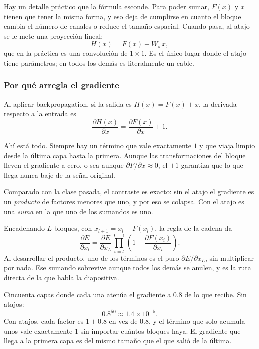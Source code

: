 \documentclass[11pt,letterpaper]{article}
\begin{document}
Hay un detalle práctico que la fórmula esconde. Para poder sumar,
$F(x)$ y $x$ tienen que tener la misma forma, y eso deja de cumplirse
en cuanto el bloque cambia el número de canales o reduce el tamaño
espacial. Cuando pasa, al atajo se le mete una proyección lineal:
\[
    H(x) = F(x) + W_s\, x ,
\]
que en la práctica es una convolución de $1 \times 1$. Es el único
lugar donde el atajo tiene parámetros; en todos los demás es
literalmente un cable.

\subsubsection*{Por qué arregla el gradiente}

Al aplicar backpropagation, si la salida es $H(x) = F(x) + x$, la
derivada respecto a la entrada es
\[
    \frac{\partial H(x)}{\partial x}
      = \frac{\partial F(x)}{\partial x} + 1 .
\]

Ahí está todo. Siempre hay un término que vale exactamente $1$ y que
viaja limpio desde la última capa hasta la primera. Aunque las
transformaciones del bloque lleven el gradiente a cero, o sea aunque
$\partial F / \partial x \approx 0$, el $+1$ garantiza que lo que
llega nunca baje de la señal original.

Comparado con la clase pasada, el contraste es exacto: sin el atajo el
gradiente es un \emph{producto} de factores menores que uno, y por eso
se colapsa. Con el atajo es una \emph{suma} en la que uno de los
sumandos es uno.

Encadenando $L$ bloques, con $x_{l+1} = x_l + F(x_l)$, la regla de la
cadena da
\[
    \frac{\partial E}{\partial x_l}
      = \frac{\partial E}{\partial x_L}
        \prod_{i=l}^{L-1}
        \left( 1 + \frac{\partial F(x_i)}{\partial x_i} \right) .
\]
Al desarrollar el producto, uno de los términos es el puro
$\partial E / \partial x_L$, sin multiplicar por nada. Ese sumando
sobrevive aunque todos los demás se anulen, y es la ruta directa de la
que habla la diapositiva.

\begin{ejemplo}
  Cincuenta capas donde cada una atenúa el gradiente a $0.8$ de lo que
  recibe. Sin atajos:
  \[
    0.8^{50} \approx 1.4 \times 10^{-5} .
  \]
  Con atajos, cada factor es $1 + 0.8$ en vez de $0.8$, y el término
  que solo acumula unos vale exactamente $1$ sin importar cuántos
  bloques haya. El gradiente que llega a la primera capa es del mismo
  tamaño que el que salió de la última.
\end{ejemplo}
\end{document}
